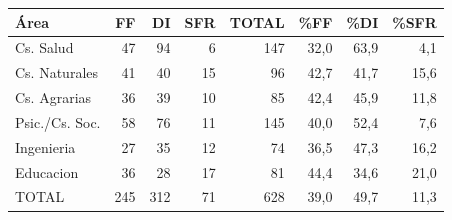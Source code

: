 \begin{tabular}{lrrrrrrr}
\toprule
Área & FF & DI & SFR & TOTAL & \%FF & \%DI & \%SFR \\
\midrule
Cs. Salud & 47 & 94 & 6 & 147 & 32,0 & 63,9 & 4,1 \\
Cs. Naturales & 41 & 40 & 15 & 96 & 42,7 & 41,7 & 15,6 \\
Cs. Agrarias & 36 & 39 & 10 & 85 & 42,4 & 45,9 & 11,8 \\
Psic./Cs. Soc. & 58 & 76 & 11 & 145 & 40,0 & 52,4 & 7,6 \\
Ingenieria & 27 & 35 & 12 & 74 & 36,5 & 47,3 & 16,2 \\
Educacion & 36 & 28 & 17 & 81 & 44,4 & 34,6 & 21,0 \\
TOTAL & 245 & 312 & 71 & 628 & 39,0 & 49,7 & 11,3 \\
\bottomrule
\end{tabular}
